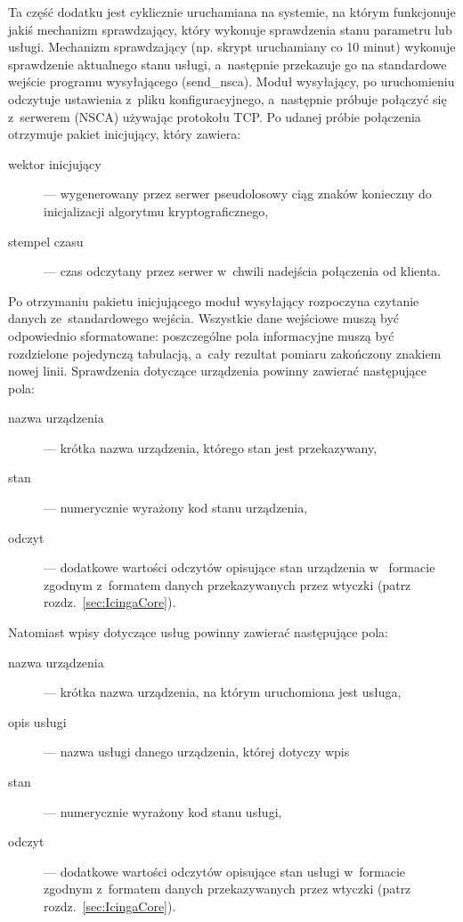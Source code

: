 Ta część dodatku jest cyklicznie uruchamiana na systemie, na którym
funkcjonuje jakiś mechanizm sprawdzający, który wykonuje sprawdzenia
stanu parametru lub usługi. Mechanizm sprawdzający (np. skrypt
uruchamiany co 10 minut) wykonuje sprawdzenie aktualnego stanu usługi,
a~następnie przekazuje go na standardowe wejście programu
wysyłającego (send\_nsca). Moduł wysyłający, po uruchomieniu
odczytuje ustawienia z~pliku konfiguracyjnego, a~następnie próbuje
połączyć się z~serwerem (NSCA) używając protokołu TCP. Po udanej
próbie połączenia otrzymuje pakiet inicjujący, który zawiera:

\begin{description}
\item[wektor inicjujący] --- wygenerowany przez serwer pseudolosowy ciąg
  znaków konieczny do inicjalizacji algorytmu kryptograficznego,
\item[stempel czasu] --- czas odczytany przez serwer w~chwili nadejścia
  połączenia od klienta.
\end{description} 

Po otrzymaniu pakietu inicjującego moduł wysyłający rozpoczyna
czytanie danych ze~standardowego wejścia. Wszystkie dane wejściowe
muszą być odpowiednio sformatowane: poszczególne pola informacyjne
muszą być rozdzielone pojedynczą tabulacją, a~cały rezultat pomiaru
zakończony znakiem nowej linii. Sprawdzenia dotyczące urządzenia
powinny zawierać następujące pola:

\begin{description}
\item[nazwa urządzenia] --- krótka nazwa urządzenia, którego stan jest
  przekazywany,
\item[stan] --- numerycznie wyrażony kod stanu urządzenia,
\item[odczyt] --- dodatkowe wartości odczytów opisujące stan
  urządzenia w~ formacie zgodnym z~formatem danych przekazywanych
  przez wtyczki (patrz rozdz.~\ref{sec:IcingaCore}).
\end{description}

Natomiast wpisy dotyczące usług powinny zawierać następujące pola:

\begin{description}
\item[nazwa urządzenia] --- krótka nazwa urządzenia, na którym uruchomiona
  jest usługa,
\item[opis usługi] --- nazwa usługi danego urządzenia, której dotyczy wpis
\item[stan] --- numerycznie wyrażony kod stanu usługi,
\item[odczyt] --- dodatkowe wartości odczytów opisujące stan usługi
  w~formacie zgodnym z~formatem danych przekazywanych przez wtyczki
  (patrz rozdz.~\ref{sec:IcingaCore}).
\end{description}

